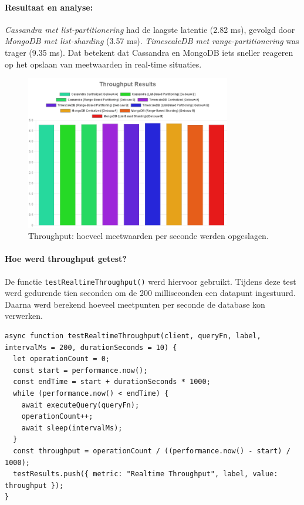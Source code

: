 \paragraph{Resultaat en analyse:}
\textit{Cassandra met list-partitionering} had de laagste latentie (2.82 ms), gevolgd door \textit{MongoDB met list-sharding} (3.57 ms). \textit{TimescaleDB met range-partitionering} was trager (9.35 ms). Dat betekent dat Cassandra en MongoDB iets sneller reageren op het opslaan van meetwaarden in real-time situaties.

\begin{figure}[H]
	\centering
	\includegraphics[width=0.8\textwidth]{Throughput.png}
	\caption{Throughput: hoeveel meetwaarden per seconde werden opgeslagen.}
	\label{fig:throughput-comparison}
\end{figure}

\paragraph{Hoe werd throughput getest?}
De functie \texttt{testRealtimeThroughput()} werd hiervoor gebruikt. Tijdens deze test werd gedurende tien seconden om de 200 milliseconden een datapunt ingestuurd. Daarna werd berekend hoeveel meetpunten per seconde de database kon verwerken.

\begin{verbatim}
async function testRealtimeThroughput(client, queryFn, label, intervalMs = 200, durationSeconds = 10) {
  let operationCount = 0;
  const start = performance.now();
  const endTime = start + durationSeconds * 1000;
  while (performance.now() < endTime) {
    await executeQuery(queryFn);
    operationCount++;
    await sleep(intervalMs);
  }
  const throughput = operationCount / ((performance.now() - start) / 1000);
  testResults.push({ metric: "Realtime Throughput", label, value: throughput });
}
\end{verbatim}

